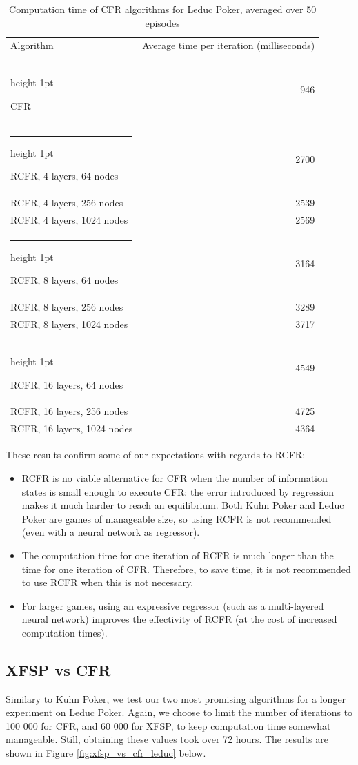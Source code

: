\documentclass[10pt,a4paper]{article}
\makeatletter
\newcommand{\thickhline}{%
    \noalign {\ifnum 0=`}\fi \hrule height 1pt
    \futurelet \reserved@a \@xhline
}
\makeatother
\begin{document}
\FloatBarrier
\begin{table}[h]
	\centering
	\begin{tabular}{|l|r|}
	\hline
	Algorithm & Average time per iteration (milliseconds)\\
	\thickhline
	CFR & 946 \\
	\thickhline
	RCFR, 4 layers, 64 nodes& 2700 \\
	\hline
	RCFR, 4 layers, 256 nodes & 2539 \\
	\hline
	RCFR, 4 layers, 1024 nodes & 2569 \\
	\thickhline
	RCFR, 8 layers, 64 nodes & 3164 \\
	\hline
	RCFR, 8 layers, 256 nodes  & 3289 \\
	\hline
	RCFR, 8 layers, 1024 nodes  & 3717 \\
	\thickhline
	RCFR, 16 layers, 64 nodes & 4549 \\
	\hline
	RCFR, 16 layers, 256 nodes & 4725 \\
	\hline
	RCFR, 16 layers, 1024 nodes & 4364 \\
	\hline
	\end{tabular}
	\caption{Computation time of CFR algorithms for Leduc Poker, averaged over 50 episodes}
	\label{tbl:leduc_times}
\end{table}
\FloatBarrier

These results confirm some of our expectations with regards to RCFR:
\begin{itemize}
\item{RCFR is no viable alternative for CFR when the number of information states is small enough to execute CFR: the error introduced by regression makes it much harder to reach an equilibrium. Both Kuhn Poker and Leduc Poker are games of manageable size, so using RCFR is not recommended (even with a neural network as regressor).}
\item{The computation time for one iteration of RCFR is much longer than the time for one iteration of CFR. Therefore, to save time, it is not recommended to use RCFR when this is not necessary.}
\item{For larger games, using an expressive regressor (such as a multi-layered neural network) improves the effectivity of RCFR (at the cost of increased computation times).}
\end{itemize}

\subsection{XFSP vs CFR}
Similary to Kuhn Poker, we test our two most promising algorithms for a longer experiment on Leduc Poker. Again, we choose to limit the number of iterations to 100 000 for CFR, and 60 000 for XFSP, to keep computation time somewhat manageable. Still, obtaining these values took over 72 hours. The results are shown in Figure \ref{fig:xfsp_vs_cfr_leduc} below.
\end{document}
